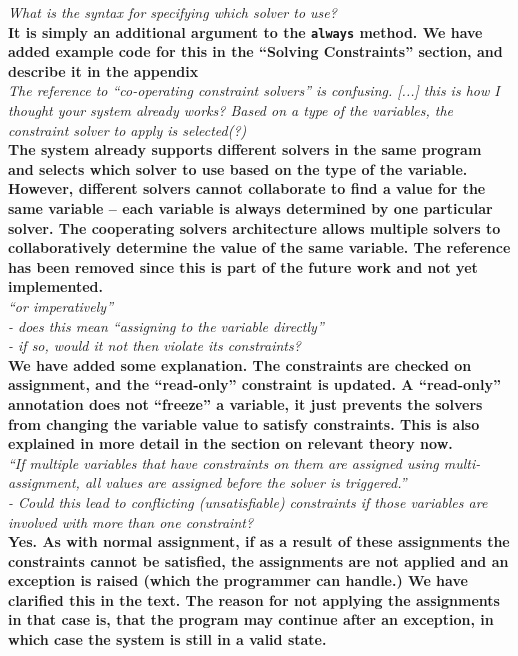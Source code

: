 \documentclass[english]{article}
\begin{document}
\textit{What is the syntax for specifying which solver to use?}\\
\textbf{It is simply an additional argument to the \lstinline{always}
  method. We have added example code for this in the ``Solving
  Constraints'' section, and describe it in the appendix}\\

\textit{The reference to ``co-operating constraint solvers'' is
  confusing. [...] this is how I thought your system already works?
  Based on a type of the variables, the constraint solver to apply is
  selected(?)}\\
\textbf{The system already supports different solvers in the same
  program and selects which solver to use based on the type of the
  variable. However, different solvers cannot collaborate to find a
  value for the same variable -- each variable is always determined by
  one particular solver. The cooperating solvers architecture allows
  multiple solvers to collaboratively determine the value of the same
  variable. The reference has been removed since this is part of
  the future work and not yet implemented.}\\

\textit{``or imperatively''\\
  - does this mean ``assigning to the variable directly''\\
  - if so, would it not then violate its constraints?}\\
\textbf{We have added some explanation. The constraints are checked on
  assignment, and the ``read-only'' constraint is updated. A
  ``read-only'' annotation does not ``freeze'' a variable, it just
  prevents the solvers from changing the variable value to satisfy
  constraints. This is also explained in more detail in the
  section on relevant theory now.}\\

\textit{``If multiple variables that have constraints on them are
  assigned using multi-assignment, all values are assigned before the
  solver is
  triggered.''\\
  - Could this lead to conflicting (unsatisfiable) constraints if
  those variables are involved with more than one constraint?}\\
\textbf{Yes. As with normal assignment, if as a result of these assignments
  the constraints cannot be satisfied, the assignments are not applied
  and an exception is raised (which the programmer can handle.) We
  have clarified this in the text. The reason for not applying the
  assignments in that case is, that the program may continue after an
  exception, in which case the system is still in a valid state.}\\
\end{document}
